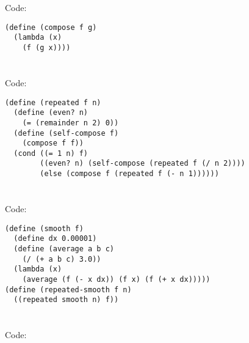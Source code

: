 \documentclass[../main.tex]{subfiles}
\begin{document}

\section{}

Code:

\begin{lstlisting}
(define (compose f g)
  (lambda (x)
    (f (g x))))
\end{lstlisting}


\section{}

Code:

\begin{lstlisting}
(define (repeated f n)
  (define (even? n)
    (= (remainder n 2) 0))
  (define (self-compose f)
    (compose f f))
  (cond ((= 1 n) f)
        ((even? n) (self-compose (repeated f (/ n 2))))
        (else (compose f (repeated f (- n 1))))))
\end{lstlisting}


\section{}

Code:

\begin{lstlisting}
(define (smooth f)
  (define dx 0.00001)
  (define (average a b c)
    (/ (+ a b c) 3.0))
  (lambda (x)
    (average (f (- x dx)) (f x) (f (+ x dx)))))
(define (repeated-smooth f n)
  ((repeated smooth n) f))
\end{lstlisting}


\section{}

Code:
\end{document}
